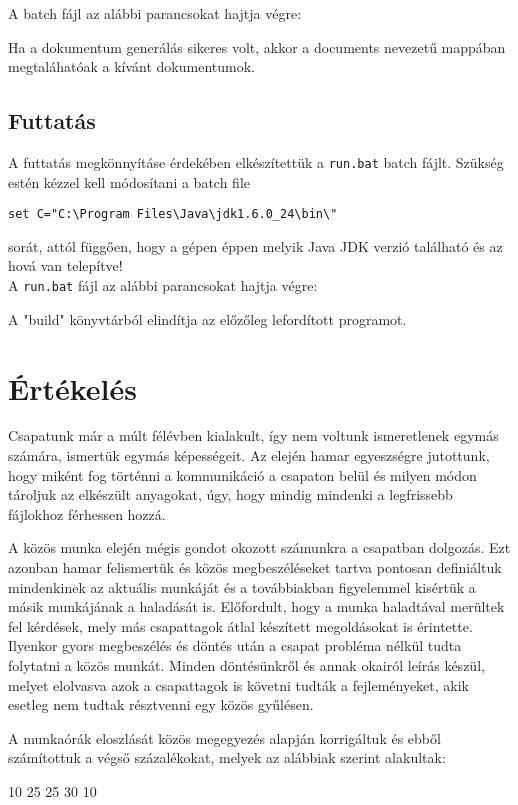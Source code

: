 A batch fájl az alábbi parancsokat hajtja végre:

Ha a dokumentum generálás sikeres volt, akkor a documents nevezetű mappában megtaláhatóak a kívánt dokumentumok.

\subsection{Futtatás}
A futtatás megkönnyításe érdekében elkészítettük a \texttt{run.bat} batch fájlt.
Szükség estén kézzel kell módosítani a batch file 
\begin{verbatim}
set C="C:\Program Files\Java\jdk1.6.0_24\bin\" 
\end{verbatim} sorát, attól függően, hogy a gépen éppen melyik Java JDK verzió található és az hová van telepítve!\\

A \texttt{run.bat} fájl az alábbi parancsokat hajtja végre:

A "build" könyvtárból elindítja az előzőleg lefordított programot.

\section{Értékelés}

Csapatunk már a múlt félévben kialakult, így nem voltunk ismeretlenek egymás számára, ismertük egymás képességeit. Az elején hamar egyeszségre jutottunk, hogy miként fog történni a kommunikáció a csapaton belül és milyen módon tároljuk az elkészült anyagokat, úgy, hogy mindig mindenki a legfrissebb fájlokhoz férhessen hozzá. 

A közös munka elején mégis gondot okozott számunkra a csapatban dolgozás. Ezt azonban hamar felismertük és közös megbeszéléseket tartva pontosan definiáltuk mindenkinek az aktuális munkáját és a továbbiakban figyelemmel kisértük a másik munkájának a haladását is. Előfordult, hogy a munka haladtával merültek fel kérdések, mely más csapattagok átlal készített megoldásokat is érintette. Ilyenkor gyors megbeszélés és döntés után a csapat probléma nélkül tudta folytatni a közös munkát. Minden döntésünkről és annak okairól leírás készül, melyet elolvasva azok a csapattagok is követni tudták a fejleményeket, akik esetleg nem tudtak résztvenni egy közös gyűlésen.

A munkaórák eloszlását közös megegyezés alapján korrigáltuk és ebből számítottuk a végső százalékokat, melyek az alábbiak szerint alakultak:

\begin{ertekeles}
{10}        %
{25}
{25}
{30}
{10}
\end{ertekeles}
